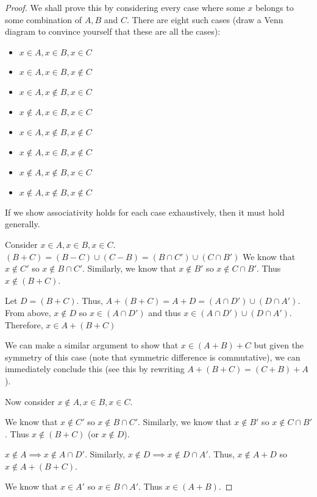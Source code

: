 \documentclass[12pt]{article}
\begin{document}
\begin{proof}
    We shall prove this by considering every case where some $x$ belongs to some combination of $A, B$
    and $C$. There are eight such cases (draw a Venn diagram to convince yourself that these are all the cases):
    \begin{itemize}
        \item $x \in A, x \in B, x \in C$
        \item $x \in A, x \in B, x \notin C$
        \item $x \in A, x \notin B, x \in C$
        \item $x \notin A, x \in B, x \in C$
        \item $x \in A, x \notin B, x \notin C$
        \item $x \notin A, x \in B, x \notin C$
        \item $x \notin A, x \notin B, x \in C$
        \item $x \notin A, x \notin B, x \notin C$
    \end{itemize}
    If we show associativity holds for each case exhaustively, then it must hold generally.

    Consider $x \in A, x \in B, x \in C$.
    $(B + C) = (B - C) \cup (C - B) = (B \cap C')\cup (C \cap B')$
    We know that $x \notin C'$ so $x \notin B \cap C'$. Similarly, we know that
    $x \notin B'$ so $x \notin C \cap B'$. Thus $x \notin (B + C)$.

    Let $D = (B + C)$. Thus, $A + (B + C) = A + D = (A \cap D')\cup (D \cap A')$.
    From above, $x \notin D$ so $x \in (A \cap D')$ and thus $x \in (A \cap D')\cup (D \cap A')$.
    Therefore, $x \in A + (B + C)$

    We can make a similar argument to show that $x \in (A + B) + C$ but given the symmetry of this case
    (note that symmetric difference is commutative), we can immediately conclude this (see this by rewriting
    $A + (B + C) = (C + B) + A$).

    Now consider $x \notin A, x \in B, x \in C$.

    We know that $x \notin C'$ so $x \notin B \cap C'$. Similarly, we know that
    $x \notin B'$ so $x \notin C \cap B'$. Thus $x \notin (B + C)$ (or $x \notin D$).

    $x \notin A \implies x \notin A \cap D'$. Similarly, $x \notin D \implies x \notin D \cap A'$.
    Thus, $x \notin A + D$ so $x \notin A + (B + C)$.

    We know that $x \in A'$ so $x \in B \cap A'$. Thus $x \in (A + B)$.


\end{proof}
\end{document}
